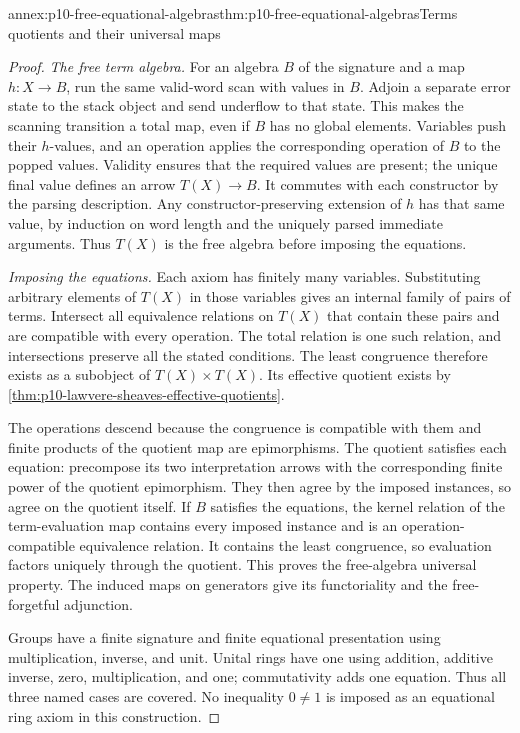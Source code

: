 \begin{annexitem}{annex:p10-free-equational-algebras}{thm:p10-free-equational-algebras}{Terms quotients and their universal maps}
\begin{proof}
\emph{The free term algebra.}
For an algebra \(B\) of the signature and a map \(h:X\to B\),
run the same valid-word scan with values in \(B\).
Adjoin a separate error state to the stack object and send underflow
to that state. This makes the scanning transition a total map,
even if \(B\) has no global elements.
Variables push their \(h\)-values, and an operation applies
the corresponding operation of \(B\) to the popped values.
Validity ensures that the required values are present;
the unique final value defines an arrow \(T(X)\to B\).
It commutes with each constructor by the parsing description.
Any constructor-preserving extension of \(h\) has that same
value, by induction on word length and the uniquely parsed
immediate arguments. Thus \(T(X)\) is the free algebra
before imposing the equations.

\emph{Imposing the equations.}
Each axiom has finitely many variables.
Substituting arbitrary elements of \(T(X)\) in those variables
gives an internal family of pairs of terms.
Intersect all equivalence relations on \(T(X)\) that contain
these pairs and are compatible with every operation.
The total relation is one such relation, and intersections
preserve all the stated conditions.
The least congruence therefore exists as a subobject of
\(T(X)\times T(X)\).
Its effective quotient exists by
\cref{thm:p10-lawvere-sheaves-effective-quotients}.

The operations descend because the congruence is compatible
with them and finite products of the quotient map are
epimorphisms. The quotient satisfies each equation:
precompose its two interpretation arrows with the
corresponding finite power of the quotient epimorphism.
They then agree by the imposed instances, so agree on
the quotient itself.
If \(B\) satisfies the equations, the kernel relation of
the term-evaluation map contains every imposed instance
and is an operation-compatible equivalence relation.
It contains the least congruence, so evaluation factors
uniquely through the quotient.
This proves the free-algebra universal property.
The induced maps on generators give its functoriality and
the free-forgetful adjunction.

Groups have a finite signature and finite equational
presentation using multiplication, inverse, and unit.
Unital rings have one using addition, additive inverse,
zero, multiplication, and one; commutativity adds one
equation. Thus all three named cases are covered.
No inequality \(0\neq1\) is imposed as an equational ring
axiom in this construction.


\end{proof}
\end{annexitem}
